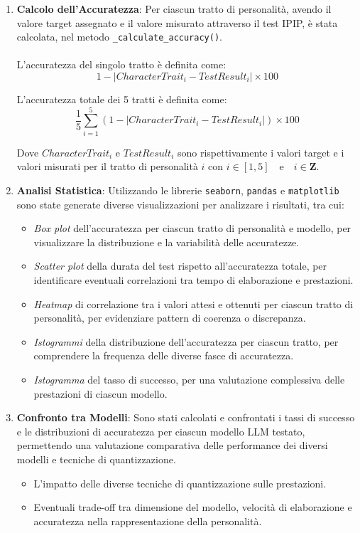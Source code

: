 \begin{enumerate}
    \item
    \textbf{Calcolo dell'Accuratezza}:
    Per ciascun tratto di personalità, avendo il valore target assegnato e il valore misurato attraverso il test IPIP, è stata calcolata, nel metodo \texttt{\_calculate\_accuracy()}.\\\\    
    L'accuratezza del singolo tratto è definita come:
    \[
    1 - \left| CharacterTrait_i - TestResult_i \right| \times 100
    \]

    L'accuratezza totale dei 5 tratti è definita come:
    \[
    \frac{1}{5} \sum_{i=1}^{5} \left( 1 - \left| CharacterTrait_i - TestResult_i \right| \right) \times 100
    \]

    Dove $CharacterTrait_i$ e $TestResult_i$ sono rispettivamente i valori target e i valori misurati per il tratto di personalità $i$
    con $ i \in [1,5] \quad \text{e} \quad i \in \mathbf{Z}$.
    

    \item
    \textbf{Analisi Statistica}:
    Utilizzando le librerie \texttt{seaborn}, \texttt{pandas} e \texttt{matplotlib} sono state generate diverse visualizzazioni per analizzare i risultati, tra cui:
    \begin{itemize}
        \item \textit{Box plot} dell'accuratezza per ciascun tratto di personalità e modello, per visualizzare la distribuzione e la variabilità delle accuratezze.
        \item \textit{Scatter plot} della durata del test rispetto all'accuratezza totale, per identificare eventuali correlazioni tra tempo di elaborazione e prestazioni.
        \item \textit{Heatmap} di correlazione tra i valori attesi e ottenuti per ciascun tratto di personalità, per evidenziare pattern di coerenza o discrepanza.
        \item \textit{Istogrammi} della distribuzione dell'accuratezza per ciascun tratto, per comprendere la frequenza delle diverse fasce di accuratezza.
        \item \textit{Istogramma} del tasso di successo, per una valutazione complessiva delle prestazioni di ciascun modello.
    \end{itemize}
    
    \item
    \textbf{Confronto tra Modelli}:
    Sono stati calcolati e confrontati i tassi di successo e le distribuzioni di accuratezza per ciascun modello LLM testato, permettendo una valutazione comparativa delle performance dei diversi modelli e tecniche di quantizzazione.
    \begin{itemize}
        \item L'impatto delle diverse tecniche di quantizzazione sulle prestazioni.
        \item Eventuali trade-off tra dimensione del modello, velocità di elaborazione e accuratezza nella rappresentazione della personalità.
    \end{itemize}
\end{enumerate}

